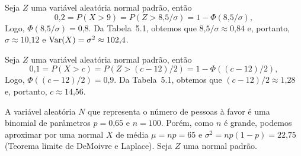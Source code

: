 \begin{questions}
\begin{solution}
	Seja $Z$ uma variável aleatória normal padrão, então
    \[\text{0,2} = P(X>9) = P(Z>\text{8,5}/\sigma) = 1-\Phi(\text{8,5}/\sigma),\]
    Logo, $\Phi(\text{8,5}/\sigma) = \text{0,8}$. Da Tabela~5.1, obtemos que $\text{8,5}/\sigma \approx \text{0,84}$ e, portanto, $\sigma \approx \text{10,12}$ e $\mathrm{Var}(X) = \sigma^2 \approx \text{102,4}$.
\end{solution}

\begin{solution}
	Seja $Z$ uma variável aleatória normal padrão, então
    \[\text{0,1} = P(X>c) = P(Z>(c-12)/2) = 1-\Phi((c-12)/2),\]
    Logo, $\Phi((c-12)/2) = \text{0,9}$. Da Tabela~5.1, obtemos que $(c-12)/2 \approx \text{1,28}$ e, portanto, $c \approx \text{14,56}$.
\end{solution}

\begin{solution}
A variável aleatória $N$ que representa o número de pessoas à favor é uma binomial de parâmetros $p=\text{0,65}$ e $n=100$. Porém, como $n$ é grande, podemos aproximar por uma normal $X$ de média $\mu = np = 65$ e $\sigma^2 = np(1-p) = \text{22,75}$ (Teorema limite de DeMoivre e Laplace). Seja $Z$ uma normal padrão.
\begin{parts}

\end{parts}
\end{solution}
\end{questions}

